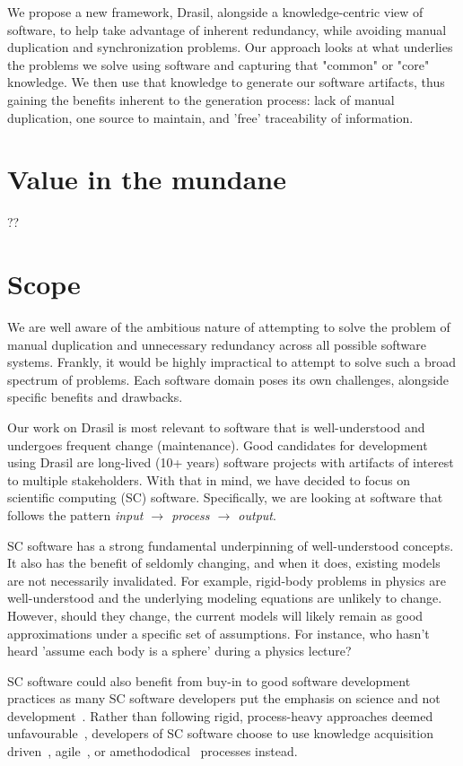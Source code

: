 We propose a new framework, Drasil, alongside a knowledge-centric view of
software, to help take advantage of inherent redundancy, while avoiding manual
duplication and synchronization problems. Our approach looks at what underlies
the problems we solve using software and capturing that "common" or "core"
knowledge. We then use that knowledge to generate our software artifacts, thus
gaining the benefits inherent to the generation process: lack of manual
duplication, one source to maintain, and 'free' traceability of information.

\section{Value in the mundane}
??

\section{Scope}
We are well aware of the ambitious nature of attempting to solve the problem of
manual duplication and unnecessary redundancy across all possible software
systems. Frankly, it would be highly impractical to attempt to solve such a
broad spectrum of problems. Each software domain poses its own challenges,
alongside specific benefits and drawbacks. 

Our work on Drasil is most relevant to software that is well-understood and 
undergoes frequent change (maintenance). Good candidates for development using
Drasil are long-lived (10+ years) software projects with artifacts of interest
to multiple stakeholders. With that in mind, we have decided to focus on
scientific computing (SC) software. Specifically, we are looking at software 
that follows the pattern \emph{input $\rightarrow$ process $\rightarrow$ 
output}.

SC software has a strong fundamental underpinning of well-understood concepts.
It also has the benefit of seldomly changing, and when it does, existing models
are not necessarily invalidated. For example, rigid-body problems in physics are
well-understood and the underlying modeling equations are unlikely to change.
However, should they change, the current models will likely remain as good
approximations under a specific set of assumptions. For instance, who hasn't
heard 'assume each body is a sphere' during a physics lecture?

SC software could also benefit from buy-in to good software development 
practices as many SC software developers put the emphasis on science and not 
development~\citep{Kelly2007}. Rather than following rigid, process-heavy 
approaches deemed unfavourable~\citep{CarverEtAl2007}, developers of SC 
software choose to use knowledge acquisition driven~\citep{Kelly2015}, 
agile~\citep{Segal2005, CarverEtAl2007, AckroydEtAl2008, 
EasterbrookAndJohns2009}, or amethododical~\citep{Kelly2013} processes instead.

